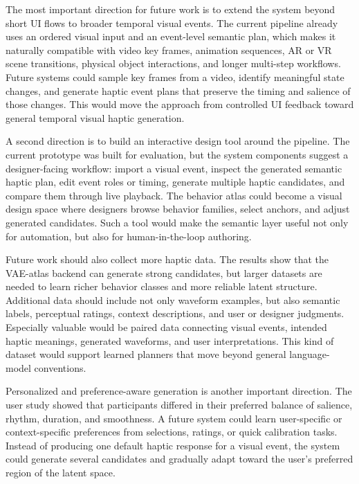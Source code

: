 The most important direction for future work is to extend the system beyond short UI flows to broader temporal visual events. The current pipeline already uses an ordered visual input and an event-level semantic plan, which makes it naturally compatible with video key frames, animation sequences, AR or VR scene transitions, physical object interactions, and longer multi-step workflows. Future systems could sample key frames from a video, identify meaningful state changes, and generate haptic event plans that preserve the timing and salience of those changes. This would move the approach from controlled UI feedback toward general temporal visual haptic generation.

A second direction is to build an interactive design tool around the pipeline. The current prototype was built for evaluation, but the system components suggest a designer-facing workflow: import a visual event, inspect the generated semantic haptic plan, edit event roles or timing, generate multiple haptic candidates, and compare them through live playback. The behavior atlas could become a visual design space where designers browse behavior families, select anchors, and adjust generated candidates. Such a tool would make the semantic layer useful not only for automation, but also for human-in-the-loop authoring.

Future work should also collect more haptic data. The results show that the VAE-atlas backend can generate strong candidates, but larger datasets are needed to learn richer behavior classes and more reliable latent structure. Additional data should include not only waveform examples, but also semantic labels, perceptual ratings, context descriptions, and user or designer judgments. Especially valuable would be paired data connecting visual events, intended haptic meanings, generated waveforms, and user interpretations. This kind of dataset would support learned planners that move beyond general language-model conventions.

Personalized and preference-aware generation is another important direction. The user study showed that participants differed in their preferred balance of salience, rhythm, duration, and smoothness. A future system could learn user-specific or context-specific preferences from selections, ratings, or quick calibration tasks. Instead of producing one default haptic response for a visual event, the system could generate several candidates and gradually adapt toward the user's preferred region of the latent space.

